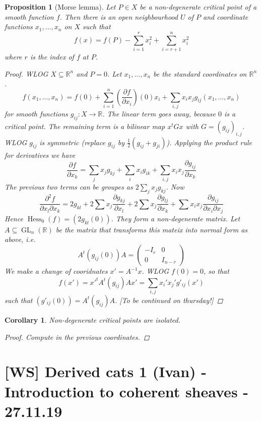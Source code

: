 \documentclass[12pt]{article}
\theoremstyle{darkgreentheorem}
\newtheorem{prop}[thm]{Proposition}
\newtheorem{cor}[thm]{Corollary}
\theoremstyle{darkbluedefinition}
\theoremstyle{darkredexample}
\theoremstyle{remark}
\newcommand{\R}{\mathbb{R}}
\newcommand{\1}{\mathbbm{1}}
\DeclareMathOperator{\Hess}{Hess}
\newcommand{\sub}{\subseteq}
\begin{document}
\begin{prop}[Morse lemma]
    Let $P\in X$ be a non-degenerate critical point of a smooth function $f$.
    Then there is an open neighbourhood $U$ of $P$ and coordinate functions $x_{1},\ldots,x_{n}$ on $X$ such that
    \[ f(x)=f(P)-\sum_{i=1}^{r}x_{i}^{2}+\sum_{i=r+1}^{n}x_{i}^{2} \]
    where $r$ is the index of $f$ at $P$.
    \begin{proof}
	WLOG $X\sub \R^{n}$ and $P=0$.
	Let $x_{1},\ldots,x_{n}$ be the standard coordinates on $\R^{n}$.
	\[ f(x_{1},\ldots,x_{n})=f(0)+\sum_{i=1}^{n}(\frac{\partial f}{\partial x_{i}})(0)x_{i}+\sum_{i,j}x_{i}x_{j}g_{ij}(x_{1},\ldots,x_{n}) \]
	for smooth functions $g_{ij}\colon X\to \R$.
	The linear term goes away, because $0$ is a critical point.
	The remaining term is a bilinear map $x^{t}Gx$ with $G=(g_{ij})_{i,j}$.
	WLOG $g_{ij}$ is symmetric (replace $g_{ij}$ by $\frac{1}{2}(g_{ij}+g_{ji})$).
	Applying the product rule for derivatives we have
	\[ \frac{\partial f}{\partial x_{k}}=\sum_{j}x_{j}g_{kj}+\sum_{i}x_{i}g_{ik}+\sum_{i,j}x_{i}x_{j}\frac{\partial g_{ij}}{\partial x_{k}} \]
	The previous two terms can be groupes as $2\sum_{j}x_{j}g_{kj}$.
	Now
	\[ \frac{\partial^{2} f}{\partial x_{l}\partial x_{k}}=2g_{kl}+2\sum x_{j}\frac{\partial g_{kj}}{\partial x_{l}} +2\sum x_{j}\frac{\partial g_{lj}}{\partial x_{k}}+\sum x_{i}x_{j}\frac{\partial g_{ij}}{\partial x_{i}\partial x_{j}} \]
	Hence $\Hess_{0}(f)=(2g_{kl}(0))$.
	They form a non-degenerate matrix.
	Let $A\sub \operatorname{GL}_{n}(\R)$ be the matrix that transforms this mateix into normal form as above, i.e.
	\[ A^{t}(g_{ij}(0))A=\begin{pmatrix} -I_{r} & 0 \\ 0 & I_{n-r}\end{pmatrix} \]
	We make a change of cooridnates $x'=A^{-1}x$.
	WLOG $f(0)=0$, so that
	\[ f(x')=x'^{t}A^{t}(g_{ij})Ax'=\sum_{i,j}x_{i}'x_{j}'g'_{ij}(x') \]
	such that $(g'_{ij}(0))=A^{t}(g_{ij})A$.
	[To be continued on thursday!]
    \end{proof}
\end{prop}

\begin{cor}
    Non-degenerate critical points are isolated.
    \begin{proof}
	Compute in the previous coordinates.
    \end{proof}
\end{cor}

\section{[WS] Derived cats 1 (Ivan) - Introduction to coherent sheaves - 27.11.19}
\end{document}
